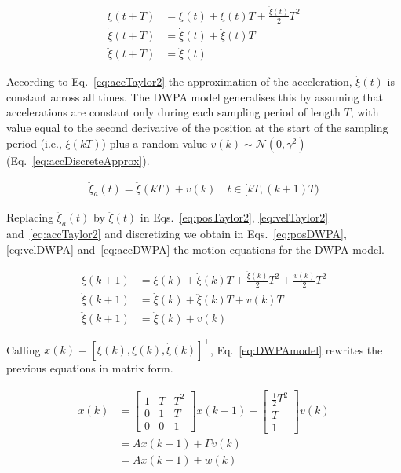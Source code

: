 \documentclass[fleqn,12pt]{article}
\begin{document}
\begin{align}
    \xi(t+T)&=\xi(t)+\dot{\xi}(t)T+\frac{\ddot{\xi}(t)}{2}T^2\label{eq:posTaylor2}\\
    \dot{\xi}(t+T)&=\dot{\xi}(t)+\ddot{\xi}(t)T\label{eq:velTaylor2}\\
    \ddot{\xi}(t+T)&=\ddot{\xi}(t)\label{eq:accTaylor2}
\end{align}

According to Eq.~\ref{eq:accTaylor2} the approximation of the acceleration,
$\ddot{\xi}(t)$ is constant across all times. The DWPA model generalises this
by assuming that accelerations are constant only during each sampling period
of length $T$, with value equal to the second derivative of the position at the
start of the sampling period (i.e., $\ddot{\xi}(kT)$) plus a random value
$v(k)\sim\mathcal{N}(0,\gamma^2)$ (Eq.~\ref{eq:accDiscreteApprox}).

\begin{align}
    \ddot{\xi}_a(t)=\ddot{\xi}(kT)+v(k)\quad t\in[kT,(k+1)T)\label{eq:accDiscreteApprox}
\end{align}

Replacing $\ddot{\xi}_a(t)$ by $\ddot{\xi}(t)$ in Eqs.~\ref{eq:posTaylor2},
\ref{eq:velTaylor2} and~\ref{eq:accTaylor2} and discretizing we obtain in
Eqs.~\ref{eq:posDWPA}, \ref{eq:velDWPA} and~\ref{eq:accDWPA} the motion
equations for the DWPA model.

\begin{align}
    \xi(k+1)&=\xi(k)+\dot{\xi}(k)T+\frac{\ddot{\xi}(k)}{2}T^2+\frac{v(k)}{2}T^2\label{eq:posDWPA}\\
    \dot{\xi}(k+1)&=\dot{\xi}(k)+\ddot{\xi}(k)T+v(k)T\label{eq:velDWPA}\\
    \ddot{\xi}(k+1)&=\ddot{\xi}(k)+v(k)\label{eq:accDWPA}
\end{align}

Calling $x(k)=[\xi(k), \dot{\xi}(k), \ddot{\xi}(k)]^\intercal$,
Eq.~\ref{eq:DWPAmodel} rewrites the previous
equations in matrix form.

\begin{align}
    x(k)&=\begin{bmatrix}
        1 & T & T^2\\
        0 & 1 & T\\
        0 & 0 & 1
           \end{bmatrix}
           x(k-1)+
           \begin{bmatrix}
               \frac{1}{2}T^2\\
               T\\
               1
           \end{bmatrix}
           v(k)\nonumber\\
           &=Ax(k-1)+\Gamma v(k)\nonumber\\
           &=Ax(k-1)+w(k)\label{eq:DWPAmodel}
\end{align}
\end{document}
